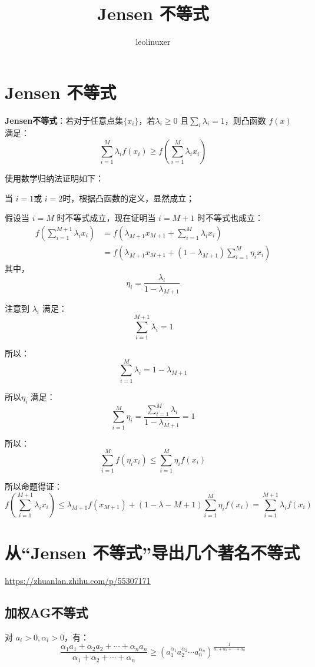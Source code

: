 \documentclass[12pt]{article}
\title{Jensen 不等式}
\author{leolinuxer}
\begin{document}
\maketitle
\tableofcontents

\section{Jensen 不等式}
\textbf{Jensen不等式}：若对于任意点集$\{x_i\}$，若$\lambda_i \ge 0$ 且$\sum_i\lambda_i = 1$，则凸函数 $f(x)$ 满足：
$$
\sum_{i=1}^{M}\lambda_if(x_i) \ge f(\sum_{i=1}^{M}\lambda_ix_i) 
$$

\begin{framed}  
\small{
使用数学归纳法证明如下：

当 $i=1$或 $i=2$时，根据凸函数的定义，显然成立；

假设当 $i=M$ 时不等式成立，现在证明当 $i=M+1$ 时不等式也成立：
\begin{align*}
f(\sum_{i=1}^{M+1}\lambda_ix_i) &= f(\lambda_{M+1}x_{M+1} + \sum_{i=1}^M\lambda_ix_i) \\
&= f(\lambda_{M+1}x_{M+1} + (1-\lambda_{M+1})\sum_{i=1}^M\eta_ix_i)
\end{align*}
其中，
$$
\eta_i = \frac{\lambda_i}{1 - \lambda_{M+1}}
$$

注意到 $\lambda_i$ 满足：
$$
\sum_{i=1}^{M+1}\lambda_i = 1
$$

所以：
$$
\sum_{i=1}^{M}\lambda_i = 1 - \lambda_{M+1}
$$

所以$\eta_i$ 满足：
$$
\sum_{i=1}^{M}\eta_i = \frac{\sum_{i=1}^{M}\lambda_i }{1 - \lambda_{M+1}} = 1
$$

所以：
$$
\sum_{i=1}^{M}f(\eta_ix_i) \le \sum_{i=1}^{M}\eta_if(x_i)
$$

所以命题得证：
$$
f(\sum_{i=1}^{M+1}\lambda_ix_i) \le \lambda_{M+1}f(x_{M+1}) + (1-\lambda-{M+1})\sum_{i=1}^{M}\eta_if(x_i) = \sum_{i=1}^{M+1}\lambda_if(x_i)
$$
}
\end{framed}


\section{从“Jensen 不等式”导出几个著名不等式}
\url{https://zhuanlan.zhihu.com/p/55307171}

\subsection{加权AG不等式}
\begin{mdframed}[
linecolor=black!40,outerlinewidth=1pt,roundcorner=.5em,innertopmargin=1ex,innerbottommargin=.5\baselineskip,innerrightmargin=1em,innerleftmargin=1em,backgroundcolor=gray!5,
]
对 $a_i > 0, \alpha_i > 0$，有：
$$
\frac{\alpha_1a_1 + \alpha_2a_2 + \cdots + \alpha_na_n}{\alpha_1 + \alpha_2 + \cdots + \alpha_n} \ge (a_1^{\alpha_1}a_2^{\alpha_2}\cdots a_n^{\alpha_n})^{\frac{1}{\alpha_1 + \alpha_2 + \cdots + \alpha_n}}
$$
\end{mdframed}
\end{document}
